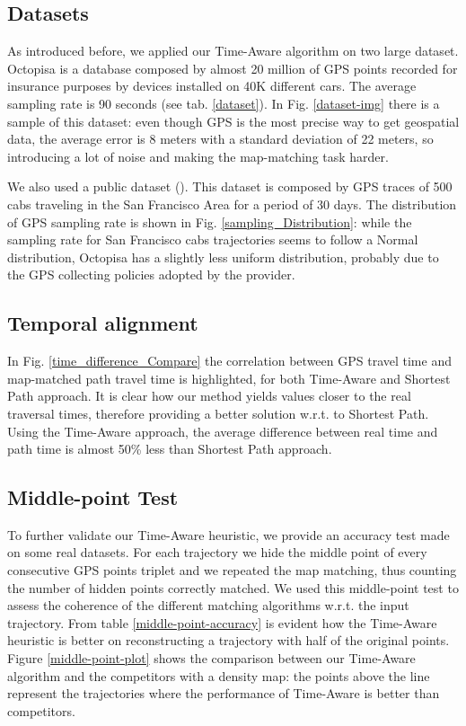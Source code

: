 \documentclass[5p]{elsarticle}
\begin{document}
\subsection{Datasets}
As introduced before, we applied our Time-Aware algorithm on two large dataset. 
Octopisa is a database composed by almost 20 million of GPS points recorded for insurance purposes by devices installed on 40K
different cars. The average sampling rate is 90 seconds (see tab. \ref{dataset}). In Fig. \ref {dataset-img} there is a sample of 
this dataset: even though GPS is the most precise way to get geospatial data, the average error is 8 meters with a standard deviation of 22 meters, 
so introducing a lot of noise and making the map-matching task harder. 

We also used a public dataset (\cite{epfl-mobility-2009-02-24}). 
This dataset is composed by GPS traces of 500 cabs traveling in the San Francisco Area for a period of 30 days. 
The distribution of GPS sampling rate is shown
in Fig. \ref{sampling_Distribution}: while the sampling rate for San Francisco cabs trajectories seems to follow a Normal distribution, Octopisa
has a slightly less uniform distribution, probably due to the GPS collecting policies adopted by the provider. 

\subsection{Temporal alignment}
In Fig. \ref{time_difference_Compare} the correlation between GPS travel time and map-matched path travel time is highlighted, for both Time-Aware and Shortest Path approach. 
It is clear how our method yields values closer to the real traversal times, therefore providing a better solution w.r.t. to Shortest Path.
Using the Time-Aware approach, the average difference between real time and path time is almost 50\% less than Shortest Path approach. 
\subsection{Middle-point Test}
To further validate our Time-Aware heuristic, we provide an accuracy test made on some real datasets. For each trajectory we hide the middle point 
of every consecutive GPS points triplet and we repeated the map matching, thus counting
the number of hidden points correctly matched. We used this middle-point test to assess the coherence of the different matching algorithms
 w.r.t. the input trajectory. From table \ref{middle-point-accuracy} is evident
how the Time-Aware heuristic is better on reconstructing a trajectory with half of the original points. Figure \ref{middle-point-plot} 
shows the comparison between our Time-Aware algorithm and the competitors with a density map: the points
above the line represent the trajectories where the performance of Time-Aware is better than competitors.
 
\end{document}

